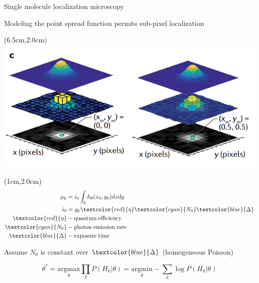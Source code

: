 \documentclass{beamer}					%
\begin{document}
\begin{frame}{Single molecule localization microscopy}

Modeling the point spread function permits sub-pixel localization 

\begin{textblock*}{8cm}(6.5cm,2.0cm)
\includegraphics[width=\textwidth]{Model.png}
\end{textblock*}

\begin{textblock*}{2cm}(1cm,2.0cm)
\begin{align*}
\mu_{k} &= i_{0}\int_{\mathrm{k}}h_{\theta}(x_{0},y_{0})dxdy\\
i_{0} &= g_{k}\textcolor{red}{\eta} \textcolor{cyan}{N_{0}}\textcolor{blue}{\Delta} 
\\
\textcolor{red}{\eta} &- \mathrm{quantum\; efficiency}\\
\textcolor{cyan}{N_{0}} &- \mathrm{photon\; emission\; rate}\\
\textcolor{blue}{\Delta} &- \mathrm{exposure\; time}
\end{align*}
\end{textblock*}

\vspace{2in}

Assume $N_{0}$ is constant over $\textcolor{blue}{\Delta}$ (homogeneous Poisson)

\begin{equation*}
\theta^{*} = \underset{\theta}{\mathrm{argmax}}\prod_{k}P(H_{k}|\theta)= \underset{\theta}{\mathrm{argmin}}-\sum_{k}\log P(H_{k}|\theta)
\end{equation*}

\end{frame}
\end{document}
